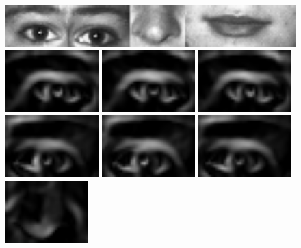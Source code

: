 \begin{figure}[h!]
	\centering
	\includegraphics[width=15cm]{imagenes/M2_concat.jpg}\\
	\includegraphics[width=3.6cm]{imagenes/M2_superpos_od_45deg.png}
	\includegraphics[width=3.6cm]{imagenes/M2_superpos_od_20deg.png}
	\includegraphics[width=3.6cm]{imagenes/M2_superpos_od_10deg.png}\\
	\includegraphics[width=3.6cm]{imagenes/M2_superpos_oi_45deg.png}
	\includegraphics[width=3.6cm]{imagenes/M2_superpos_oi_20deg.png}
	\includegraphics[width=3.6cm]{imagenes/M2_superpos_oi_10deg.png}\\
	\includegraphics[width=3.2cm]{imagenes/M2_superpos_nariz_45deg.png}

\end{figure}
